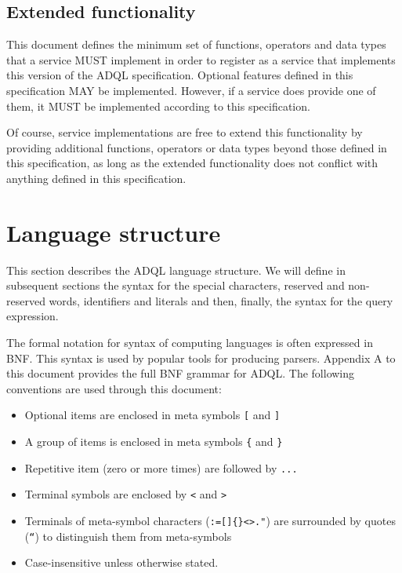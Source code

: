 \documentclass[11pt,a4paper]{ivoa}
\begin{document}
\subsection{Extended functionality}
\label{sec:extending}

This document defines the minimum set of functions, operators and data types
that a service MUST implement in order to register as a service that
implements this version of the ADQL specification. Optional features defined in
this specification MAY be implemented. However, if a service does provide one of
them, it MUST be implemented according to this specification.

Of course, service implementations are free to extend this functionality by
providing additional functions, operators or data types beyond those defined in
this specification, as long as the extended functionality does not conflict
with anything defined in this specification.

\clearpage %
\section{Language structure}
\label{sec:language}

This section describes the ADQL language structure. We will define in
subsequent sections the syntax for the special characters, reserved and non-
reserved words, identifiers and literals and then, finally, the syntax for
the query expression.

The formal notation for syntax of computing languages is often expressed
in BNF. This syntax is used by popular tools for
producing parsers. Appendix A to this document provides the full BNF grammar
for ADQL. The following conventions are used through this document:

\begin{itemize}
    \item Optional items are enclosed in meta symbols \verb:[: and \verb:]:
    \item A group of items is enclosed in meta symbols \verb:{: and \verb:}:
    \item Repetitive item (zero or more times) are followed by \verb:...:
    \item Terminal symbols are enclosed by \verb:<: and \verb:>:
    \item Terminals of meta-symbol characters (\verb!:=[]{}<>."!) are surrounded by quotes (\verb:“:) to distinguish them from meta-symbols
    \item Case-insensitive unless otherwise stated.
\end{itemize}
\end{document}
